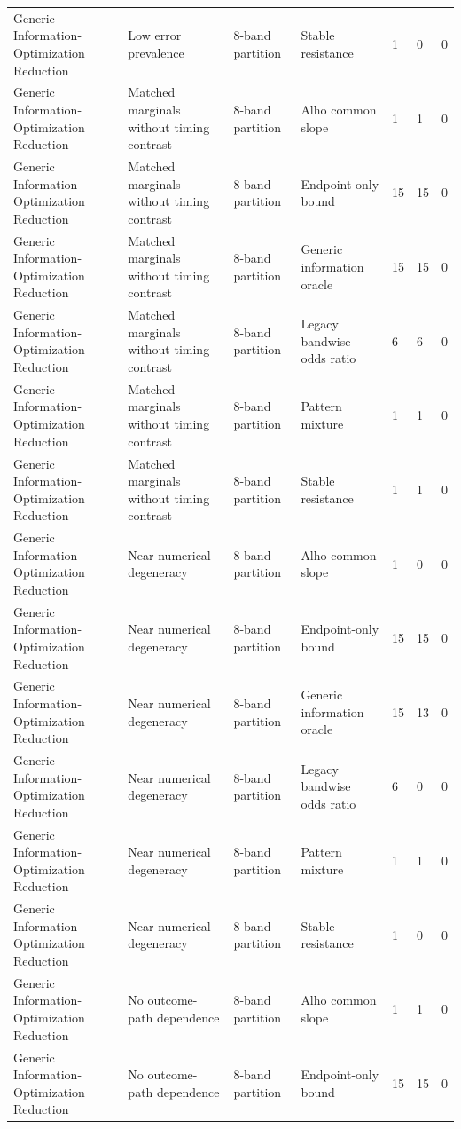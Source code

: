 \begin{tabular}{lllllll}
Generic Information-Optimization Reduction & Low error prevalence & 8-band partition & Stable resistance & 1 & 0 & 0 \\
Generic Information-Optimization Reduction & Matched marginals without timing contrast & 8-band partition & Alho common slope & 1 & 1 & 0 \\
Generic Information-Optimization Reduction & Matched marginals without timing contrast & 8-band partition & Endpoint-only bound & 15 & 15 & 0 \\
Generic Information-Optimization Reduction & Matched marginals without timing contrast & 8-band partition & Generic information oracle & 15 & 15 & 0 \\
Generic Information-Optimization Reduction & Matched marginals without timing contrast & 8-band partition & Legacy bandwise odds ratio & 6 & 6 & 0 \\
Generic Information-Optimization Reduction & Matched marginals without timing contrast & 8-band partition & Pattern mixture & 1 & 1 & 0 \\
Generic Information-Optimization Reduction & Matched marginals without timing contrast & 8-band partition & Stable resistance & 1 & 1 & 0 \\
Generic Information-Optimization Reduction & Near numerical degeneracy & 8-band partition & Alho common slope & 1 & 0 & 0 \\
Generic Information-Optimization Reduction & Near numerical degeneracy & 8-band partition & Endpoint-only bound & 15 & 15 & 0 \\
Generic Information-Optimization Reduction & Near numerical degeneracy & 8-band partition & Generic information oracle & 15 & 13 & 0 \\
Generic Information-Optimization Reduction & Near numerical degeneracy & 8-band partition & Legacy bandwise odds ratio & 6 & 0 & 0 \\
Generic Information-Optimization Reduction & Near numerical degeneracy & 8-band partition & Pattern mixture & 1 & 1 & 0 \\
Generic Information-Optimization Reduction & Near numerical degeneracy & 8-band partition & Stable resistance & 1 & 0 & 0 \\
Generic Information-Optimization Reduction & No outcome-path dependence & 8-band partition & Alho common slope & 1 & 1 & 0 \\
Generic Information-Optimization Reduction & No outcome-path dependence & 8-band partition & Endpoint-only bound & 15 & 15 & 0 \\

\end{tabular}
